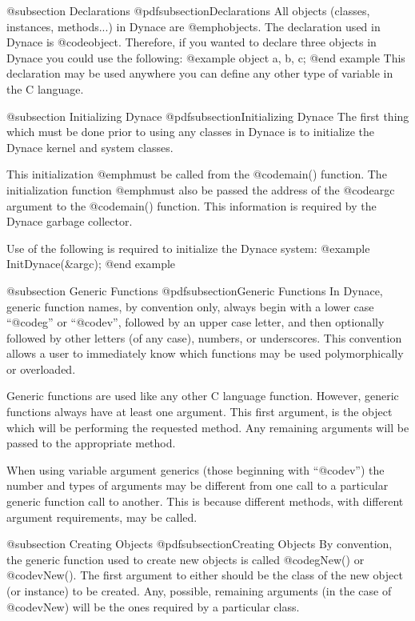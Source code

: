 @subsection Declarations
@pdfsubsection{Declarations}
All objects (classes, instances, methods...) in Dynace are @emph{objects}.
The declaration used in Dynace is @code{object}.  Therefore, if you wanted
to declare three objects in Dynace you could use the following:
@example
        object   a, b, c;
@end example
This declaration may be used anywhere you can define any other type of
variable in the C language.

@subsection Initializing Dynace
@pdfsubsection{Initializing Dynace}
The first thing which must be done prior to using any classes in Dynace is
to initialize the Dynace kernel and system classes.

This initialization @emph{must} be called from the @code{main()}
function.  The initialization function @emph{must} also be passed the
address of the @code{argc} argument to the @code{main()} function.  This
information is required by the Dynace garbage collector.

Use of the following is required to initialize the Dynace system:
@example
        InitDynace(&argc);
@end example


@subsection Generic Functions
@pdfsubsection{Generic Functions}
In Dynace, generic function names, by convention only, always begin with
a lower case ``@code{g}'' or ``@code{v}'', followed by an upper case
letter, and then optionally followed by other letters (of any case),
numbers, or underscores.  This convention allows a user to immediately
know which functions may be used polymorphically or overloaded.

Generic functions are used like any other C language function.  However,
generic functions always have at least one argument.  This first argument,
is the object which will be performing the requested method.  Any remaining
arguments will be passed to the appropriate method.

When using variable argument generics (those beginning with
``@code{v}'') the number and types of arguments may be different from
one call to a particular generic function call to another.  This is
because different methods, with different argument requirements, may be
called.

@subsection Creating Objects
@pdfsubsection{Creating Objects}
By convention, the generic function used to create new objects is called
@code{gNew()} or @code{vNew()}.  The first argument to either should be
the class of the new object (or instance) to be created.  Any, possible,
remaining arguments (in the case of @code{vNew}) will be the ones
required by a particular class.

